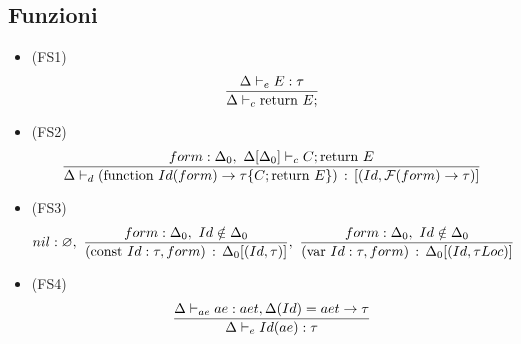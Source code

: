 \documentclass{article}
\begin{document}
\subsection*{Funzioni}
\begin{itemize}
  \item (FS1)
        \[\frac{\displaystyle \Delta \vdash_e E : \tau}{\displaystyle \Delta \vdash_c \text{return}\ E;}
        \]
  \item (FS2)
        \[\frac{\displaystyle 
            form : \Delta_0,\
            \Delta[\Delta_0] \vdash_c C; \text{return}\ E
          }{\displaystyle 
            \Delta \vdash_d (\text{function}\ Id(form) \rightarrow \tau \{C;\text{return}\ E\}) \,:\, [(Id, \mathcal{F}(form) \rightarrow \tau)]
          }
        \]
  \item (FS3)
        \[
          nil : \varnothing,\
          \frac{\displaystyle 
            form : \Delta_0,\ Id \notin \Delta_0
          }{\displaystyle 
            (\text{const}\ Id:\tau, form) \,:\, \Delta_0[(Id, \tau)]
          },\
          \frac{\displaystyle 
            form : \Delta_0,\ Id \notin \Delta_0
          }{\displaystyle 
            (\text{var}\ Id:\tau, form) \,:\, \Delta_0[(Id, \tau Loc)]
          }
        \]
  \item (FS4)
        \[\frac{\displaystyle 
            \Delta \vdash_{ae} ae : aet, \Delta(Id) = aet \rightarrow \tau
          }{\displaystyle 
            \Delta \vdash_e Id(ae) : \tau
          }
        \]
\end{itemize}
\pagebreak
\end{document}
